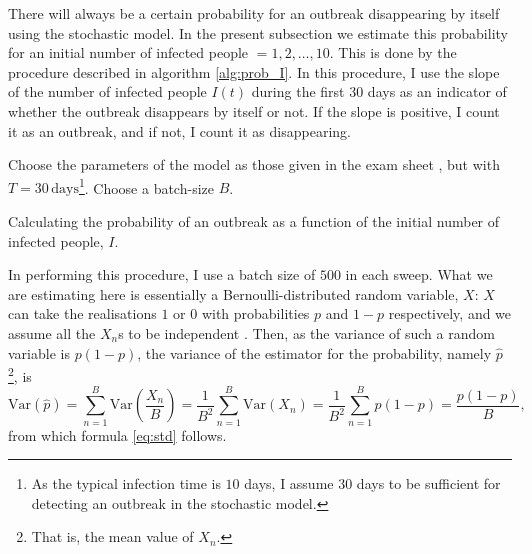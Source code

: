 There will always be a certain probability for an outbreak disappearing by itself using the stochastic model. In the present subsection we estimate this probability for an initial number of infected people $=1,2,\dots,10$. This is done by the procedure described in algorithm \ref{alg:prob_I}. In this procedure, I use the slope of the number of infected people $I(t)$ during the first $30$ days as an indicator of whether the outbreak disappears by itself or not. If the slope is positive, I count it as an outbreak, and if not, I count it as disappearing.

\begin{algorithm}[H]
	Choose the parameters of the model as those given in the exam sheet \cite{sheet}, but with $T = 30 \, \mathrm{days}$\footnote{As the typical infection time is $10$ days, I assume 30 days to be sufficient for detecting an outbreak in the stochastic model.}. \;
	Choose a batch-size $B$.\;
	\caption{Calculating the probability of an outbreak as a function of the initial number of infected people, $I$. }
	\label{alg:prob_I}
\end{algorithm} 

In performing this procedure, I use a batch size of $500$ in each sweep. What we are estimating here is essentially a Bernoulli-distributed random variable, $X$: $X$ can take the realisations $1$ or $0$ with probabilities $p$ and $1-p$ respectively, and we assume all the $X_n$s to be independent \cite[~p.26]{Wassermann}. Then, as the variance of such a random variable is $p(1-p)$, the variance of the estimator for the probability, namely $\hat{p}$\footnote{That is, the mean value of $X_n$.}, is 
$$
	\mathrm{Var}(\hat{p}) =  \sum_{n= 1}^{B} \mathrm{Var}\left(\frac{X_n}{B}\right) = \frac{1}{B^2} \sum_{n= 1}^{B} \mathrm{Var}(X_n) = \frac{1}{B^2} \sum_{n= 1}^{B} p (1-p) = \frac{p(1-p)}{B},
$$
from which formula \eqref{eq:std} follows. 

